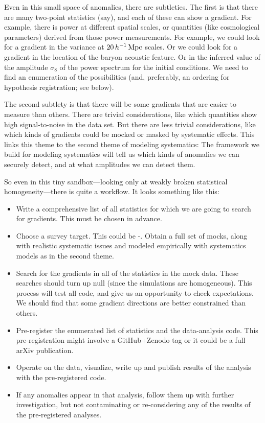 \documentclass[12pt, fullpage, letterpaper]{article}
\begin{document}
Even in this small space of anomalies, there are subtleties. The first
is that there are many two-point statistics (say), and each of these can
show a gradient. For example, there is power at different spatial scales,
or quantities (like cosmological parameters) derived from those power
measurements. For example, we could look for a gradient in the variance at
$20\,h^{-1}\,{\mathrm{Mpc}}$ scales. Or we could look for a gradient in the location
of the baryon acoustic feature. Or in the inferred value of the amplitude
$\sigma_8$ of the power spectrum for the initial conditions.
We need to find an enumeration of the possibilities (and, preferably, an
ordering for hypothesis registration; see below).

The second subtlety is that there will be some gradients that are easier
to measure than others. There are trivial considerations, like which
quantities show high signal-to-noise in the data set. But there are less
trivial considerations, like which kinds of gradients could be mocked or
masked by systematic effects.
This links this theme to the second theme of modeling systematics:
The framework we build for modeling systematics will tell us which
kinds of anomalies we can securely detect, and at what amplitudes we
can detect them.

So even in this tiny sandbox---looking only at weakly broken
statistical homogeneity---there is quite a workflow. It looks
something like this:
\begin{itemize}
\item
Write a comprehensive list of all statistics for which we are going to search
for gradients. This must be chosen in advance.
\item
Choose a survey target. This could be
\SDSSIV-. Obtain a full set of mocks, along
with realistic systematic issues and modeled empirically with
systematics models as in the second theme.
\item
Search for the gradients in all of the statistics in the mock
data. These searches should turn up null (since the simulations are
homogeneous). This process will test all code, and give us an
opportunity to check expectations. We should find that some gradient
directions are better constrained than others.
\item
Pre-register the enumerated list of statistics and the data-analysis code.
This pre-registration might involve a GitHub+Zenodo tag or it could be
a full arXiv publication.
\item
Operate on the data, visualize, write up and publish results of the
analysis with the pre-registered code.
\item
If any anomalies appear in that analysis, follow them up with further
investigation, but not contaminating or re-considering any of the results
of the pre-registered analyses.
\end{itemize}
\end{document}

